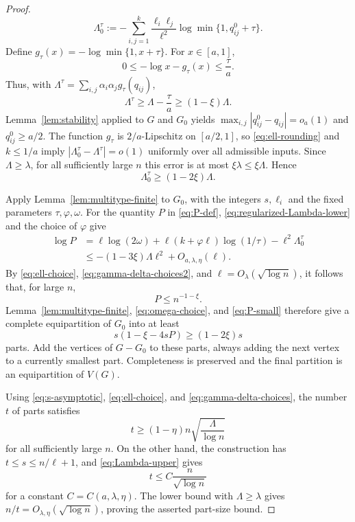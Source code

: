 \documentclass{article}
\begin{document}
\begin{proof}
\[
 \Lambda_0^{\tau}
 :=-\sum_{i,j=1}^k\frac{\ell_i\ell_j}{\ell^2}
 \log\min\{1,q_{ij}^0+\tau\}.
\]
Define $g_\tau(x)=-\log\min\{1,x+\tau\}$.  For $x\in[a,1]$,
\[
 0\le -\log x-g_\tau(x)\le\frac\tau a.
\]
Thus, with $\Lambda^\tau=\sum_{i,j}\alpha_i\alpha_j g_\tau(q_{ij})$,
\[
 \Lambda^\tau\ge\Lambda-\frac\tau a\ge(1-\xi)\Lambda.
\]
Lemma~\ref{lem:stability} applied to $G$ and $G_0$ yields $\max_{i,j}\left|q_{ij}^0 - q_{ij}\right| = o_a(1)$ and $q^0_{ij} \geq a/2$. The function $g_\tau$ is $2/a$-Lipschitz on $[a/2,1]$, so \eqref{eq:ell-rounding} and $k\le1/a$ imply $|\Lambda_0^\tau-\Lambda^\tau|=o(1)$ uniformly over all admissible inputs. Since $\Lambda\ge\lambda$, for all sufficiently large $n$ this error is at most $\xi\lambda\le\xi\Lambda$.  Hence
\begin{equation}\label{eq:regularized-Lambda-lower}
 \Lambda_0^{\tau}\ge(1-2\xi)\Lambda.
\end{equation}

Apply Lemma~\ref{lem:multitype-finite} to $G_0$, with the integers $s,\ell_i$ and the fixed parameters $\tau,\varphi,\omega$.  For the quantity $P$ in \eqref{eq:P-def}, \eqref{eq:regularized-Lambda-lower} and the choice of $\varphi$ give
\begin{align*}
 \log P
 &=\ell\log(2\omega)
   +\ell(k+\varphi\ell)\log(1/\tau)
   -\ell^2\Lambda_0^{\tau}\\
 &\le -(1-3\xi)\Lambda\ell^2+O_{a,\lambda,\eta}(\ell).
\end{align*}
By \eqref{eq:ell-choice}, \eqref{eq:gamma-delta-choices2}, and $\ell=O_\lambda(\sqrt{\log n})$, it follows that, for large $n$,
\begin{equation}\label{eq:P-small}
 P\le n^{-1-\xi}.
\end{equation}
Lemma~\ref{lem:multitype-finite}, \eqref{eq:omega-choice}, and \eqref{eq:P-small} therefore give a complete equipartition of $G_0$ into at least
\[
 s\left(1-\xi-4sP\right)\ge(1-2\xi)s
\]
parts.  Add the vertices of $G-G_0$ to these parts, always adding the next vertex to a currently smallest part.  Completeness is preserved and the final partition is an equipartition of $V(G)$.

Using \eqref{eq:s-asymptotic}, \eqref{eq:ell-choice}, and \eqref{eq:gamma-delta-choices}, the number $t$ of parts satisfies
\[
 t\ge(1-\eta)n\sqrt{\frac\Lambda{\log n}}
\]
for all sufficiently large $n$.  On the other hand, the construction has $t\le s\le n/\ell+1$, and \eqref{eq:Lambda-upper} gives
\[
 t\le C\frac n{\sqrt{\log n}}
\]
for a constant $C=C(a,\lambda,\eta)$.  The lower bound with $\Lambda\ge\lambda$ gives $n/t=O_{\lambda,\eta}(\sqrt{\log n})$, proving the asserted part-size bound.
\end{proof}
\end{document}

